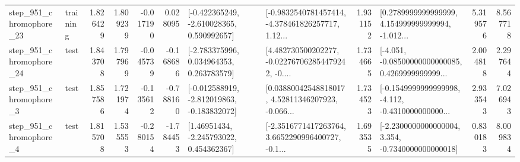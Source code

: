 \begin{tabular}{llrrrrllrlrr}
  step\_951\_chromophore\_23 &  training &      1.826429 &    1.809239 &     -0.017190 &  0.028095 &   [-0.422365249, -2.610028365, 0.590992657] &  [-0.9832540781457414, -4.378461826257717, 1.12... &       1.931152 &  [0.2789999999999999, 4.154999999999994, -1.012... &            5.319576 &          8.567718 \\
  step\_951\_chromophore\_24 &      test &      1.843708 &    1.797969 &     -0.045739 & -0.168686 &    [-2.783375996, 0.034964353, 0.263783579] &  [4.482730500202277, -0.022767062854479242, -0.... &       1.734665 &  [-4.051, -0.08500000000000085, 0.4269999999999... &            2.004818 &          2.297644 \\
   step\_951\_chromophore\_3 &      test &      1.857586 &    1.721974 &     -0.135612 & -0.788160 &  [-0.012588919, -2.812019863, -0.183832072] &  [0.03880042548818017, 4.52811346207923, -0.066... &       1.734523 &  [-0.1549999999999998, -4.112, -0.4310000000000... &            2.933543 &          7.026943 \\
   step\_951\_chromophore\_4 &      test &      1.815708 &    1.535553 &     -0.280154 & -1.784453 &     [1.46951434, -2.245793022, 0.454362367] &  [-2.3516771417263764, 3.6652290996400727, -0.1... &       1.693535 &  [-2.2300000000000004, 3.354, -0.7340000000000018] &            0.830183 &          8.009834 \\
\bottomrule
\end{tabular}

